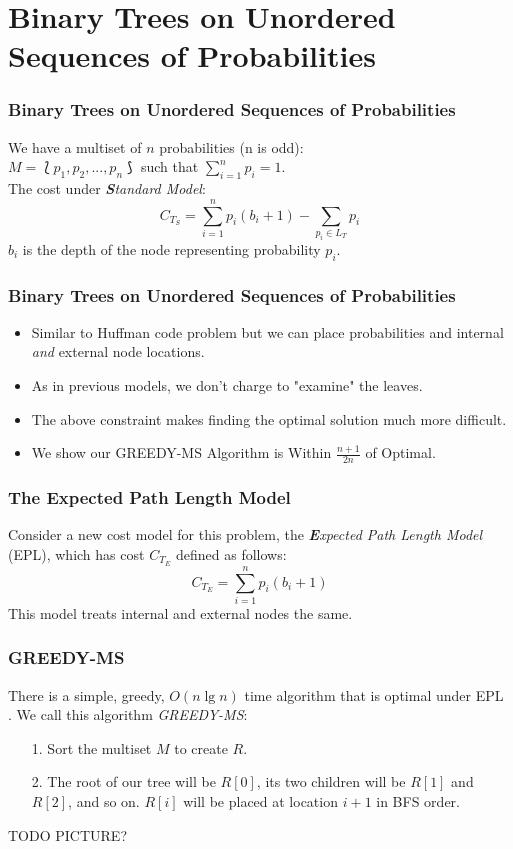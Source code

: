 \documentclass{beamer}
\theoremstyle{plain}
\begin{document}
\section{Binary Trees on Unordered Sequences of Probabilities}\label{BST over Multisets}

\begin{frame} \frametitle{Binary Trees on Unordered Sequences of Probabilities}
We have a multiset of $n$ probabilities (n is odd): \\
$M = \lbag p_1, p_2, ..., p_n \rbag$ such that $\sum\limits_{i=1}^n p_i = 1$.  \\
The cost under \textit{\textbf{S}tandard Model}:
\begin{equation}
C_{T_S} = \sum_{i=1}^{n} p_i(b_i+1) - \sum_{p_i \in L_T} p_i
\end{equation}
$b_i$ is the depth of the node representing probability $p_i$.
\end{frame}

\begin{frame} \frametitle{Binary Trees on Unordered Sequences of Probabilities}
\begin{itemize}
\item Similar to Huffman code problem but we can place probabilities and internal \textit{and} external node locations.
\item As in previous models, we don't charge to "examine" the leaves.
\item The above constraint makes finding the optimal solution much more difficult.
\item We show our GREEDY-MS Algorithm is Within $\frac{n+1}{2n}$ of Optimal.
\end{itemize}
\end{frame}



\begin{frame} \frametitle{The \textbf{E}xpected Path Length Model}
Consider a new cost model for this problem, the \textit{\textbf{E}xpected Path Length Model} (EPL), which has cost $C_{T_E}$ defined as follows:
\begin{equation}
C_{T_E} = \sum_{i=1}^{n} p_i(b_i+1)
\end{equation}
This model treats internal and external nodes the same.
\end{frame}

\begin{frame} \frametitle{GREEDY-MS}
There is a simple, greedy, $O(n \lg n)$ time algorithm that is optimal under EPL \cite{golin2012huffman}. We call this algorithm \textit{GREEDY-MS}:

\begin{itemize}
\item[1.] Sort the multiset $M$ to create $R$.

\item[2.] The root of our tree will be $R[0]$, its two children will be $R[1]$ and $R[2]$, and so on. $R[i]$ will be placed at location $i+1$ in BFS order.
\end{itemize}
TODO PICTURE?
\end{frame}
\end{document}
